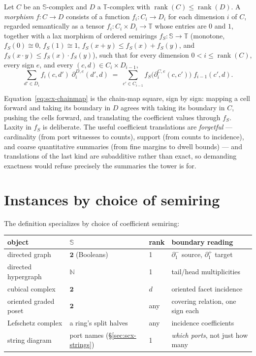 \begin{definition}
\label{def:scx-morphism}
Let $C$ be an $\mathbb{S}$-complex and $D$ a $\mathbb{T}$-complex
with $\operatorname{rank}(C) \le \operatorname{rank}(D)$. A
\emph{morphism} $f \colon C \to D$ consists of a function
$f_i \colon C_i \to D_i$ for each dimension $i$ of $C$, regarded
semantically as a tensor
$f_i \colon C_i \times D_i \to \mathbb{T}$ whose entries are $0$
and $1$, together with a lax
morphism of ordered semirings
$f_S \colon \mathbb{S} \to \mathbb{T}$ (monotone, $f_S(0) \cong 0$,
$f_S(1) \cong 1$, $f_S(x+y) \le f_S(x) + f_S(y)$, and
$f_S(x \cdot y) \le f_S(x) \cdot f_S(y)$), such that for every
dimension $0 < i \le \operatorname{rank}(C)$, every sign $e$, and
every $(c, d) \in C_i \times D_{i-1}$,
\begin{equation}
\label{eq:scx-chainmap}
\sum_{d' \in D_i} f_i(c, d')\; \partial_i^{D,e}(d', d)
\;=\;
\sum_{c' \in C_{i-1}} f_S\!\big(\partial_i^{C,e}(c, c')\big)\; f_{i-1}(c', d).
\end{equation}
\end{definition}

Equation~\eqref{eq:scx-chainmap} is the chain-map square, sign by
sign: mapping a cell forward and taking its boundary in $D$ agrees
with taking its boundary in $C$, pushing the cells forward, and
translating the coefficient values through $f_S$. Laxity in $f_S$ is
deliberate. The useful coefficient translations are
\emph{forgetful} --- cardinality (from port witnesses to counts),
support (from counts to incidence), and coarse quantitative summaries
(from fine margins to dwell bounds) --- and translations of the last
kind are subadditive rather than exact, so demanding exactness would
refuse precisely the summaries the tower is for.

\section{Instances by choice of semiring}
\label{sec:scx-instances}

The definition specializes by choice of coefficient semiring:

\begin{center}
\begin{tabular}{@{}llll@{}}
\toprule
object & $\mathbb{S}$ & rank & boundary reading \\
\midrule
directed graph & $\mathbf{2}$ (Booleans) & 1 & $\partial_1^{-}$ source, $\partial_1^{+}$ target \\
directed hypergraph & $\mathbb{N}$ & 1 & tail/head multiplicities \\
cubical complex & $\mathbf{2}$ & $d$ & oriented facet incidence \\
oriented graded poset & $\mathbf{2}$ & any & covering relation, one sign each \\
Lefschetz complex & a ring's split halves & any & incidence coefficients \\
string diagram & port names (\S\ref{sec:scx-strings}) & 1 & \emph{which ports}, not just how many \\
\bottomrule
\end{tabular}
\end{center}

